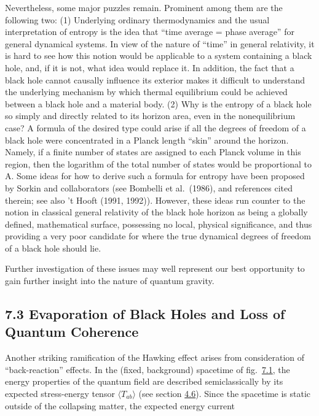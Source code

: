\documentclass[11pt,a4paper]{article}
\begin{document}
Nevertheless, some major puzzles remain. Prominent among them are the following two: (1) Underlying ordinary thermodynamics and the usual interpretation of entropy is the idea that ``time average = phase average'' for general dynamical systems. In view of the nature of ``time'' in general relativity, it is hard to see how this notion would be applicable to a system containing a black hole, and, if it is not, what idea would replace it. In addition, the fact that a black hole cannot causally influence its exterior makes it difficult to understand the underlying mechanism by which thermal equilibrium could be achieved between a black hole and a material body. (2) Why is the entropy of a black hole so simply and directly related to its horizon area, even in the nonequilibrium case? A formula of the desired type could arise if all the degrees of freedom of a black hole were concentrated in a Planck length ``skin'' around the horizon. Namely, if a finite number of states are assigned to each Planck volume in this region, then the logarithm of the total number of states would be proportional to A. Some ideas for how to derive such a formula for entropy have been proposed by Sorkin and collaborators (see Bombelli et al.~(1986), and references cited therein; see also 't Hooft (1991, 1992)). However, these ideas run counter to the notion in classical general relativity of the black hole horizon as being a globally defined, mathematical surface, possessing no local, physical significance, and thus providing a very poor candidate for where the true dynamical degrees of freedom of a black hole should lie.

Further investigation of these issues may well represent our best opportunity to gain further insight into the nature of quantum gravity.

\subsection*{7.3 Evaporation of Black Holes and Loss of Quantum Coherence}\hypertarget{sec:7.3}{}

Another striking ramification of the Hawking effect arises from consideration of ``back-reaction'' effects. In the (fixed, background) spacetime of fig.~\hyperref[fig:7.1]{7.1}, the energy properties of the quantum field are described semiclassically by its expected stress-energy tensor \(\langle T_{ab}\rangle\) (see section \hyperlink{sec:4.6}{4.6}). Since the spacetime is static outside of the collapsing matter, the expected energy current
\end{document}
